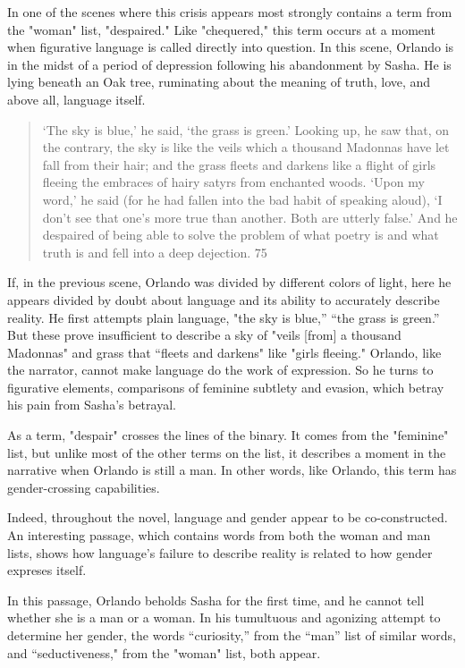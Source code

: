 \documentclass[11pt]{article}
\begin{document}
In one of the scenes where this crisis appears most strongly contains
a term from the "woman" list, "despaired." Like "chequered," this term
occurs at a moment when figurative language is called directly into
question. In this scene, Orlando is in the midst of a period of
depression following his abandonment by Sasha. He is lying beneath an
Oak tree, ruminating about the meaning of truth, love, and above all,
language itself.
\begin{quote}
‘The sky is blue,’ he said, ‘the grass is green.’ Looking up, he saw
that, on the contrary, the sky is like the veils which a thousand
Madonnas have let fall from their hair; and the grass fleets and
darkens like a flight of girls fleeing the embraces of hairy satyrs
from enchanted woods. ‘Upon my word,’ he said (for he had fallen into
the bad habit of speaking aloud), ‘I don’t see that one’s more true
than another. Both are utterly false.’ And he despaired of being able
to solve the problem of what poetry is and what truth is and fell into
a deep dejection. 75
\end{quote}
If, in the previous scene, Orlando was divided by different colors of
light, here he appears divided by doubt about language and its ability
to accurately describe reality. He first attempts plain language, "the
sky is blue,” “the grass is green.” But these prove insufficient to
describe a sky of "veils [from] a thousand Madonnas" and grass that
“fleets and darkens" like "girls fleeing." Orlando, like the narrator,
cannot make language do the work of expression. So he turns to
figurative elements, comparisons of feminine subtlety and evasion,
which betray his pain from Sasha's betrayal.

As a term, "despair" crosses the lines of the binary. It comes from
the "feminine" list, but unlike most of the other terms on the list,
it describes a moment in the narrative when Orlando is still a man.
In other words, like Orlando, this term has gender-crossing
capabilities. 

Indeed, throughout the novel, language and gender appear to be
co-constructed. An interesting passage, which contains words from both
the woman and man lists, shows how language's failure to describe
reality is related to how gender expreses itself.

In this passage, Orlando beholds Sasha for the first time, and he
cannot tell whether she is a man or a woman. In his tumultuous and
agonizing attempt to determine her gender, the words “curiosity,” from
the “man” list of similar words, and “seductiveness," from the "woman"
list, both appear.
\end{document}
